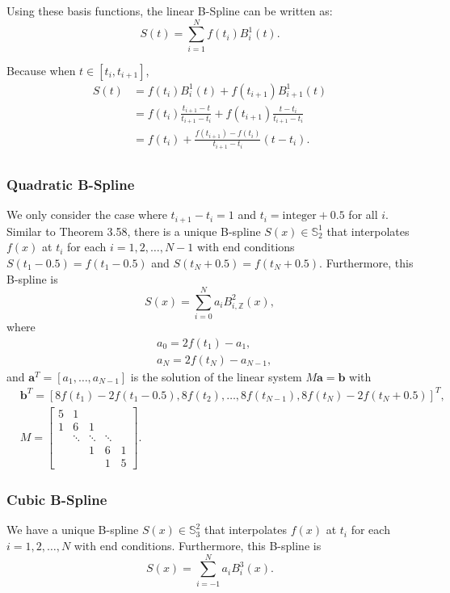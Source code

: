 \documentclass[a4paper]{article}
\begin{document}
\begin{sloppypar}
Using these basis functions, the linear B-Spline can be written as:
\[ S(t) = \sum_{i=1}^{N} f(t_i) B_i^1(t). \]

Because when $t\in[t_{i},t_{i+1}]$,
$$
\begin{aligned}
  S(t)&=f(t_i)B_i^1(t)+f(t_{i+1})B_{i+1}^1(t)\\
  &=f(t_i)\frac{t_{i+1}-t}{t_{i+1}-t_i}+f(t_{i+1})\frac{t-t_i}{t_{i+1}-t_i}\\
  &=f(t_i) + \frac{f(t_{i+1}) - f(t_i)}{t_{i+1} - t_i} (t - t_i).\\
\end{aligned}
$$

\subsubsection{Quadratic B-Spline}
We only consider the case where \( t_{i+1} - t_{i} = 1 \) and \( t_i = \text{integer} + 0.5 \) for all \( i \).
Similar to Theorem 3.58, there is a unique B-spline $S(x) \in \mathbb{S}_{2}^{1}$ that interpolates $f(x)$ at $t_i$ for each $i = 1, 2, \ldots, N-1$ with end conditions $S(t_1-0.5) = f(t_1-0.5)$ and $S(t_N+0.5) = f(t_N+0.5)$. Furthermore, this B-spline is
$$
S(x) = \sum_{i=0}^{N} a_i B_{i,\mathbb{Z}}^{2}(x),
$$
where
$$
\begin{aligned}
&a_0 = 2f(t_1) - a_1, \\
&a_N = 2f(t_N) - a_{N-1},
\end{aligned}
$$
and $\mathbf{a}^T = [a_1, \ldots, a_{N-1}]$ is the solution of the linear system $M \mathbf{a} = \mathbf{b}$ with
$$
\begin{aligned}
&\mathbf{b}^T = \left[ 8f\left(t_1\right) - 2f(t_1-0.5), 8f\left(t_2\right), \ldots, 8f\left(t_{N-1}\right), 8f\left(t_N\right) - 2f(t_N+0.5) \right]^T, \\
&M = \begin{bmatrix}
5 & 1 \\
1 & 6 & 1 \\
& \ddots & \ddots & \ddots \\
&& 1 & 6 & 1 \\
&&& 1 & 5
\end{bmatrix}.
\end{aligned}
$$


\subsubsection{Cubic B-Spline}
We have a unique B-spline $S(x) \in \mathbb{S}_{3}^{2}$ that interpolates $f(x)$ at $t_i$ for each $i = 1, 2, \ldots, N$ with end conditions. Furthermore, this B-spline is
$$
S(x)=\sum_{i=-1}^{N}a_iB^3_i(x).
$$


\end{sloppypar}
\end{document}
